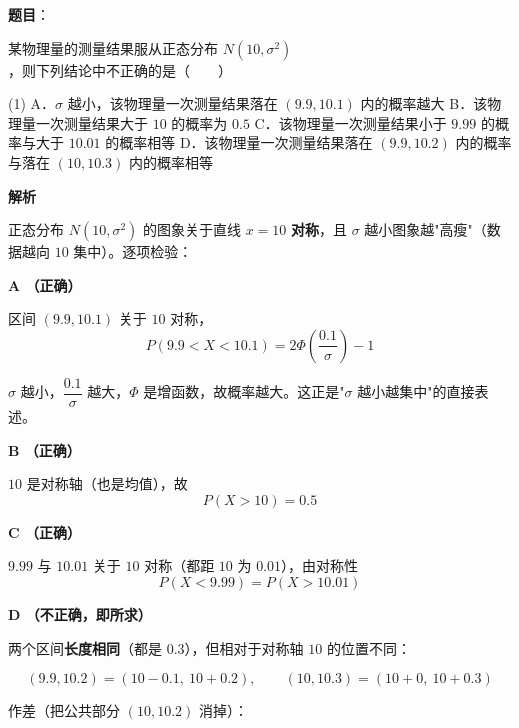 \begin{answer}

\textbf{题目}：

某物理量的测量结果服从正态分布 $N\left(10,\sigma^{2}\right)$，则下列结论中不正确的是\mbox{（　　）}

\begin{gkopts}(1)
\task A．$\sigma$ 越小，该物理量一次测量结果落在 $(9.9,10.1)$ 内的概率越大
\task B．该物理量一次测量结果大于 $10$ 的概率为 $0.5$
\task C．该物理量一次测量结果小于 $9.99$ 的概率与大于 $10.01$ 的概率相等
\task D．该物理量一次测量结果落在 $(9.9,10.2)$ 内的概率与落在 $(10,10.3)$ 内的概率相等
\end{gkopts}

\textbf{解析}

正态分布 $N\left(10,\sigma^{2}\right)$ 的图象关于直线 $x=10$ \textbf{对称}，且 $\sigma$ 越小图象越"高瘦"（数据越向 $10$ 集中）。逐项检验：

\par\medskip

\textbf{A （正确）}

区间 $(9.9,10.1)$ 关于 $10$ 对称，
\nopagebreak[4]
\[P(9.9<X<10.1)=2\Phi\left(\frac{0.1}\sigma\right)-1\]

$\sigma$ 越小，$\dfrac{0.1}\sigma$ 越大，$\Phi$ 是增函数，故概率越大。这正是"$\sigma$ 越小越集中"的直接表述。

\par\medskip

\textbf{B （正确）}

$10$ 是对称轴（也是均值），故
\nopagebreak[4]
\[P(X>10)=0.5\]

\par\medskip

\textbf{C （正确）}

$9.99$ 与 $10.01$ 关于 $10$ 对称（都距 $10$ 为 $0.01$），由对称性
\nopagebreak[4]
\[P(X<9.99)=P(X>10.01)\]

\par\medskip

\textbf{D （不正确，即所求）}

两个区间\textbf{长度相同}（都是 $0.3$），但相对于对称轴 $10$ 的位置不同：

\nopagebreak[4]
\[(9.9,10.2)=(10-0.1,\ 10+0.2),\qquad (10,10.3)=(10+0,\ 10+0.3)\]

作差（把公共部分 $(10,10.2)$ 消掉）：


\end{answer}

